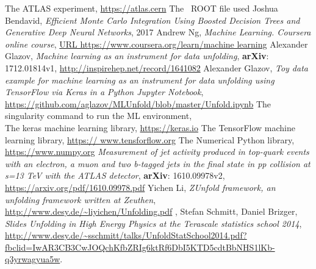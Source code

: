 \begin{thebibliography}{11}

 The ATLAS experiment, \url{https://atlas.cern}
 The \ttbaremu~ROOT file used {\tiny \texttt{}}
 Joshua Bendavid, \textit{Efficient Monte Carlo Integration Using Boosted Decision Trees and Generative Deep Neural Networks}, 2017
 Andrew Ng, \textit{Machine Learning. Coursera online course}, \url{URL https://www.coursera.org/learn/machine learning}
 Alexander Glazov, \textit{Machine learning as an instrument for data unfolding}, \textbf{arXiv}: 1712.01814v1, \url{http://inspirehep.net/record/1641082}
 Alexander Glazov, \textit{Toy data example for machine learning as an instrument  for data unfolding using TensorFlow via Keras in a Python Jupyter Notebook}, \url{https://github.com/aglazov/MLUnfold/blob/master/Unfold.ipynb}
 The singularity command to run the ML environment, \\ {\tiny \texttt {}}
 The keras machine learning library, \url{https://keras.io}
 The TensorFlow machine learning library, \url{https:// www.tensforflow.org}
 The Numerical Python library, \url{https://www.numpy.org}
 \textit{Measurement of jet activity produced in top-quark events with an electron, a muon and two b-tagged jets in the final state in pp collision at s=13 TeV with the ATLAS detector}, \textbf{arXiv}: 1610.09978v2, \url{https://arxiv.org/pdf/1610.09978.pdf}
 Yichen Li, \textit{ZUnfold framework, an unfolding framework written at Zeuthen}, \url{http://www.desy.de/~liyichen/Unfolding.pdf}
, Stefan Schmitt, Daniel Brizger, \textit{Slides Unfolding in High Energy Physics at the Terascale statistics school 2014}, \url{http://www.desy.de/~sschmitt/talks/UnfoldStatSchool2014.pdf?fbclid=IwAR3CB3CwJOQchKfbZRIg6ktRf6DbI5KTD5cdtBbNHS1lKb-q3yrwagyua5w}.

\end{thebibliography}
